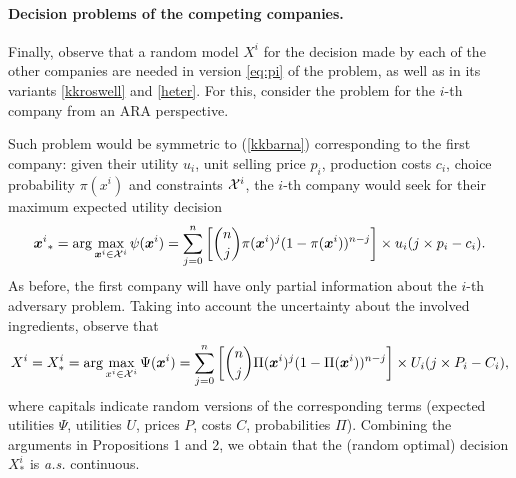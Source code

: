 \documentclass[a4paper,fleqn, 11pt]{cas-sc}
\newtheorem{lemma}{Lemma}
\begin{document}
\paragraph{{\bf Decision problems of the competing companies.}} 
Finally, observe that a random model $X^i$ for the decision
made by each of the other companies are needed in version \eqref{eq:pi} of the problem,
  as well as in its variants \eqref{kkroswell} and \eqref{heter}. 
 For this, %
consider the problem 
for the $i$-th company from an  ARA perspective. %

Such problem would be symmetric to (\ref{kkbarna})
  corresponding to the first company: given their utility 
 $u_i$, unit selling price $p_i$, production costs $c_i$, 
 choice probability $\pi (x^i)$ and constraints ${\cal X}^i$,
  the $i$-th company would seek for their maximum expected utility decision
\begin{equation*}%
    {{\bm x}^i}_ *=\arg \max_{{\bm x}^i\in {\cal X}^i }\psi({\bm x}^i ) = \sum_{j=0}^n 
    \left[ \binom{n}{j} \pi({\bm x}^i )^j (1 - \pi({\bm x}^i ))^{n-j} \right] \times u_i (j \times p_i - c_i).
\end{equation*}
As before, the first company will have only partial information about the $i$-th adversary problem.
Taking into account the uncertainty about the involved ingredients, 
  observe that 
\begin{equation*}%
  X^i = X^i_* = \arg\max _{x^i \in {\cal X}^i }  \Psi({\bm x}^i ) = \sum_{j=0}^n 
    \left[ \binom{n}{j} \Pi({\bm x}^i )^j (1 - \Pi({\bm x}^i ))^{n-j} \right] \times U_i (j \times P_i - C_i),     
\end{equation*}
where capitals indicate random versions of the corresponding terms (expected utilities $\Psi$, utilities $U$, prices $P$, costs $C$, probabilities $\Pi$).  Combining the arguments in Propositions 1 and 2, we obtain that the (random optimal) decision $X^i_* $  is \textit{a.s.} continuous.

\end{document}
